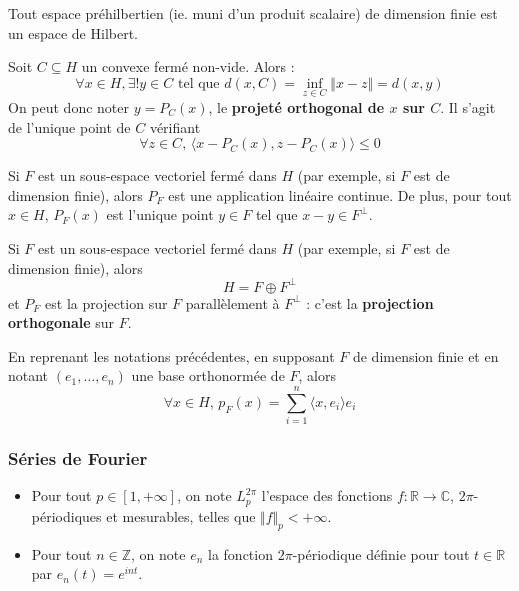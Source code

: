   \begin{example}
    Tout espace préhilbertien (ie. muni d'un produit scalaire) de dimension finie est un espace de Hilbert.
  \end{example}

  \begin{theorem}
    Soit $C \subseteq H$ un convexe fermé non-vide. Alors :
    \[ \forall x \in H, \exists! y \in C \text{ tel que } d(x, C) = \inf_{z \in C} \Vert x - z \Vert = d(x, y) \]
    On peut donc noter $y = P_C(x)$, le \textbf{projeté orthogonal de $x$ sur $C$}. Il s'agit de l'unique point de $C$ vérifiant
    \[ \forall z \in C, \, \langle x - P_C(x), z - P_C(x) \rangle \leq 0 \]
  \end{theorem}

  \begin{theorem}
    Si $F$ est un sous-espace vectoriel fermé dans $H$ (par exemple, si $F$ est de dimension finie), alors $P_F$ est une application linéaire continue. De plus, pour tout $x \in H$, $P_F(x)$ est l'unique point $y \in F$ tel que $x-y \in F^\perp$.
  \end{theorem}

  \begin{theorem}
    Si $F$ est un sous-espace vectoriel fermé dans $H$ (par exemple, si $F$ est de dimension finie), alors
    \[ H = F \oplus F^\perp \]
    et $P_F$ est la projection sur $F$ parallèlement à $F^\perp$ : c'est la \textbf{projection orthogonale} sur $F$.
  \end{theorem}


  \begin{remark}
    En reprenant les notations précédentes, en supposant $F$ de dimension finie et en notant $(e_1, \dots, e_n)$ une base orthonormée de $F$, alors
    \[ \forall x \in H, \, p_F(x) = \sum_{i=1}^{n} \langle x, e_i \rangle e_i \]
  \end{remark}

  \subsubsection{Séries de Fourier}


  \begin{notation}
    \begin{itemize}
      \item Pour tout $p \in [1, +\infty]$, on note $L_p^{2\pi}$ l'espace des fonctions $f : \mathbb{R} \rightarrow \mathbb{C}$, $2\pi$-périodiques et mesurables, telles que $\Vert f \Vert_p < +\infty$.
      \item Pour tout $n \in \mathbb{Z}$, on note $e_n$ la fonction $2\pi$-périodique définie pour tout $t \in \mathbb{R}$ par $e_n(t) = e^{int}$.
    \end{itemize}
  \end{notation}

